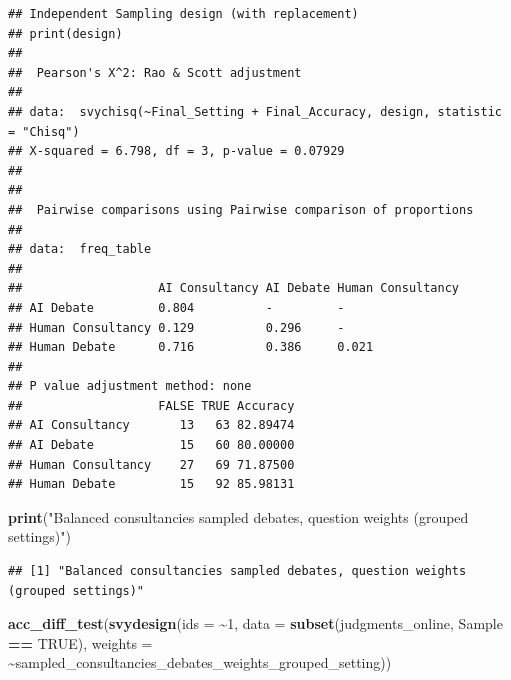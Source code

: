 \documentclass[
]{article}
\newenvironment{Shaded}{\begin{snugshade}}{\end{snugshade}}
\newcommand{\AttributeTok}[1]{\textcolor[rgb]{0.13,0.29,0.53}{#1}}
\newcommand{\ConstantTok}[1]{\textcolor[rgb]{0.56,0.35,0.01}{#1}}
\newcommand{\DecValTok}[1]{\textcolor[rgb]{0.00,0.00,0.81}{#1}}
\newcommand{\FunctionTok}[1]{\textcolor[rgb]{0.13,0.29,0.53}{\textbf{#1}}}
\newcommand{\NormalTok}[1]{#1}
\newcommand{\SpecialCharTok}[1]{\textcolor[rgb]{0.81,0.36,0.00}{\textbf{#1}}}
\newcommand{\StringTok}[1]{\textcolor[rgb]{0.31,0.60,0.02}{#1}}
\begin{document}
\begin{verbatim}
## Independent Sampling design (with replacement)
## print(design)
## 
##  Pearson's X^2: Rao & Scott adjustment
## 
## data:  svychisq(~Final_Setting + Final_Accuracy, design, statistic = "Chisq")
## X-squared = 6.798, df = 3, p-value = 0.07929
## 
## 
##  Pairwise comparisons using Pairwise comparison of proportions 
## 
## data:  freq_table 
## 
##                   AI Consultancy AI Debate Human Consultancy
## AI Debate         0.804          -         -                
## Human Consultancy 0.129          0.296     -                
## Human Debate      0.716          0.386     0.021            
## 
## P value adjustment method: none 
##                   FALSE TRUE Accuracy
## AI Consultancy       13   63 82.89474
## AI Debate            15   60 80.00000
## Human Consultancy    27   69 71.87500
## Human Debate         15   92 85.98131
\end{verbatim}

\begin{Shaded}
\begin{Highlighting}[]
\FunctionTok{print}\NormalTok{(}\StringTok{"Balanced consultancies sampled debates, question weights (grouped settings)"}\NormalTok{)}
\end{Highlighting}
\end{Shaded}

\begin{verbatim}
## [1] "Balanced consultancies sampled debates, question weights (grouped settings)"
\end{verbatim}

\begin{Shaded}
\begin{Highlighting}[]
\FunctionTok{acc\_diff\_test}\NormalTok{(}\FunctionTok{svydesign}\NormalTok{(}\AttributeTok{ids =} \SpecialCharTok{\textasciitilde{}}\DecValTok{1}\NormalTok{, }\AttributeTok{data =} \FunctionTok{subset}\NormalTok{(judgments\_online, }\StringTok{\textasciigrave{}}\AttributeTok{Sample}\StringTok{\textasciigrave{}} \SpecialCharTok{==} \ConstantTok{TRUE}\NormalTok{), }\AttributeTok{weights =} \SpecialCharTok{\textasciitilde{}}\NormalTok{sampled\_consultancies\_debates\_weights\_grouped\_setting))}
\end{Highlighting}
\end{Shaded}
\end{document}
